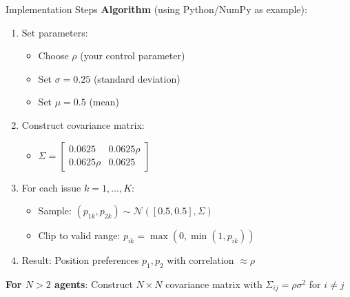 \documentclass{beamer}
\begin{document}
\begin{frame}{Implementation Steps}
\textbf{Algorithm} (using Python/NumPy as example):

\begin{enumerate}
    \item Set parameters:
    \begin{itemize}
        \item Choose $\rho$ (your control parameter)
        \item Set $\sigma = 0.25$ (standard deviation)
        \item Set $\mu = 0.5$ (mean)
    \end{itemize}
    
    \item Construct covariance matrix:
    \begin{itemize}
        \item $\Sigma = \begin{bmatrix} 0.0625 & 0.0625\rho \\ 0.0625\rho & 0.0625 \end{bmatrix}$
    \end{itemize}
    
    \item For each issue $k = 1, \ldots, K$:
    \begin{itemize}
        \item Sample: $(p_{1k}, p_{2k}) \sim \mathcal{N}([0.5, 0.5], \Sigma)$
        \item Clip to valid range: $p_{ik} = \max(0, \min(1, p_{ik}))$
    \end{itemize}
    
    \item Result: Position preferences $p_1, p_2$ with correlation $\approx \rho$
\end{enumerate}

\vspace{0.3cm}

\textbf{For $N > 2$ agents}: Construct $N \times N$ covariance matrix with $\Sigma_{ij} = \rho\sigma^2$ for $i \neq j$
\end{frame}
\end{document}
